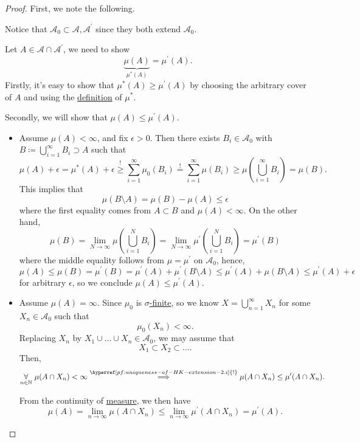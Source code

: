 \begin{proof}
	First, we note the following.
	\begin{note}
		Notice that \(\mathcal{A}_0 \subset \mathcal{A}, \mathcal{A} ^\prime \) since they both extend \(\mathcal{A}_0\).
	\end{note}

	Let \(A\in \mathcal{A} \cap \mathcal{A} ^\prime \), we need to show
	\[
		\underbrace{\mu (A)}_{\mu ^{*} (A)} = \mu ^\prime (A).
	\]
	Firstly, it's easy to show that \(\mu ^{*} (A)\geq \mu ^\prime (A)\) by choosing the arbitrary cover of \(A\) and using the \hyperref[prop:outer-measure]{definition}  of
	\(\mu ^{*} \).

	Secondly, we will show that \(\mu (A)\leq \mu ^\prime (A)\).
	\begin{itemize}
		\item \label{pf:uniqueness-of-HK-extension-2.i}Assume \(\mu (A)<\infty \), and fix \(\epsilon >0\). Then there exists \(B_{i}\in\mathcal{A} _0\) with \(B\coloneqq \bigcup\limits_{i=1}^{\infty} B_{i}\supset A\)
		      such that
		      \[
			      \mu (A)+\epsilon = \mu ^{*} (A) + \epsilon\overset{\hyperref[prop:outer-measure]{!}}{\geq} \sum\limits_{i=1}^{\infty} \mu _0(B_{i}) \overset{\hyperref[def:pre-measure-countable-additivity-within-the-algebra]{!}}{=} \sum\limits_{i=1}^{\infty} \mu (B_{i})\geq \mu \left(\bigcup\limits_{i=1}^{\infty} B_{i}\right) = \mu (B).
		      \]
		      This implies that
		      \[
			      \mu (B\setminus A) = \mu (B) - \mu (A)\leq \epsilon
		      \]
		      where the first equality comes from \(A\subset B\) and \(\mu (A)<\infty \). On the other hand,
		      \[
			      \mu (B) = \lim\limits_{N \to \infty} \mu \left(\bigcup\limits_{i=1}^{N} B_{i}\right) = \lim\limits_{N \to \infty} \mu ^\prime \left(\bigcup\limits_{i=1}^{N} B_{i}\right) = \mu ^\prime (B)
		      \]
		      where the middle equality follows from \(\mu  = \mu ^\prime \) on \(\mathcal{A} _0\), hence,
		      \[
			      \mu (A)\leq \mu (B) = \mu ^\prime (B) = \mu ^\prime (A)+\mu ^\prime (B\setminus A) \leq \mu ^\prime (A) + \mu (B\setminus A) \leq \mu ^\prime (A) + \epsilon
		      \]
		      for arbitrary \(\epsilon \), so we conclude \(\mu (A)\leq \mu ^\prime (A)\).
		\item Assume \(\mu (A) = \infty \). Since \(\mu _0\) is \hyperref[def:finite-measure]{\(\sigma \)-finite}, so we know \(X = \bigcup\limits_{n=1}^{\infty} X_{n}\) for some \(X_{n}\in\mathcal{A} _0\) such that
		      \[
			      \mu _0(X_{n})<\infty.
		      \]
		      Replacing \(X_{n}\) by \(X_{1}\cup \ldots \cup X_{n} \in\mathcal{A} _0\), we may assume that
		      \[
			      X_1 \subset X_2 \subset \ldots.
		      \]
		      Then,
		      \[
			      \underset{n\in\mathbb{\MakeUppercase{N}} }{\forall}\ \mu (A \cap X_{n})<\infty\overset{\hyperref[pf:uniqueness-of-HK-extension-2.i]{!}}{\implies} \mu (A\cap X_{n})\leq \mu ^\prime (A\cap X_{n}).
		      \]

		      From the continuity of \hyperref[def:measure]{measure}, we then have
		      \[
			      \mu (A) = \lim\limits_{n \to \infty} \mu (A\cap X_{n})\leq \lim\limits_{n \to \infty} \mu ^\prime (A\cap X_{n}) = \mu ^\prime (A).
		      \]
	\end{itemize}
\end{proof}


